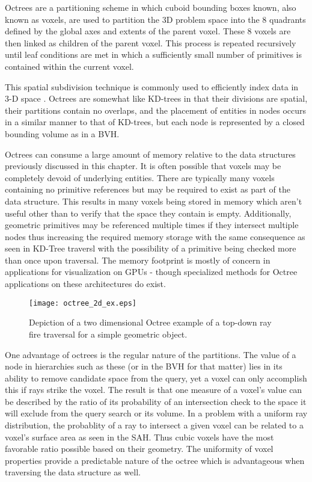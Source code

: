 Octrees are a partitioning scheme in which cuboid bounding boxes known, also
known as voxels, are used to partition the 3D problem space into the 8 quadrants
defined by the global axes and extents of the parent voxel. These 8 voxels are
then linked as children of the parent voxel. This process is repeated
recursively until leaf conditions are met in which a sufficiently small number
of primitives is contained within the current voxel.

This spatial subdivision technique is commonly used to efficiently index
data in 3-D space \cite{Glassner_1989}. Octrees are somewhat like KD-trees in
that their divisions are spatial, their partitions contain no overlaps, and the
placement of entities in nodes occurs in a similar manner to that of KD-trees,
but each node is represented by a closed bounding volume as in a BVH.

Octrees can consume a large amount of memory relative to the data
structures previously discussed in this chapter. It is often possible that
voxels may be completely devoid of underlying entities. There are typically many
voxels containing no primitive references but may be required to exist as part
of the data structure. This results in many voxels being stored in memory which
aren't useful other than to verify that the space they contain is
empty. Additionally, geometric primitives may be referenced multiple times if
they intersect multiple nodes thus increasing the required memory storage with
the same consequence as seen in KD-Tree traversl with the possibility of a
primitive being checked more than once upon traversal. The memory footprint is
mostly of concern in applications for visualization on GPUs - though specialized methods for Octree applications on these architectures do exist.

\begin{figure}[H]
  \centering
  \texttt{[image: octree\_2d\_ex.eps]}
  \caption{Depiction of a two dimensional Octree example of a top-down ray fire traversal for a simple geometric object.}
  \label{fig:2D_octree}
\end{figure}

One advantage of octrees is the regular nature of the partitions. The value of a
node in hierarchies such as these (or in the BVH for that matter) lies in its
ability to remove candidate space from the query, yet a voxel can only
accomplish this if rays strike the voxel. The result is that one measure of a
voxel's value can be described by the ratio of its probability of an
intersection check to the space it will exclude from the query search or its
volume. In a problem with a uniform ray distribution, the probablity of a ray to
intersect a given voxel can be related to a voxel's surface area as seen in the
SAH. Thus cubic voxels have the most favorable ratio possible based on their
geometry. The uniformity of voxel properties provide a predictable nature of the
octree which is advantageous when traversing the data structure as well.

